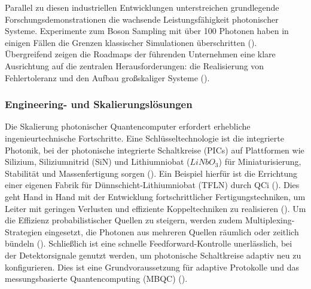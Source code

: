 Parallel zu diesen industriellen Entwicklungen unterstreichen grundlegende Forschungsdemonstrationen die wachsende Leistungsfähigkeit photonischer Systeme. Experimente zum Boson Sampling mit über 100 Photonen haben in einigen Fällen die Grenzen klassischer Simulationen überschritten (\cite{LinearOpticsScalable}). Übergreifend zeigen die Roadmaps der führenden Unternehmen eine klare Ausrichtung auf die zentralen Herausforderungen: die Realisierung von Fehlertoleranz und den Aufbau großskaliger Systeme (\cite{QuandelaAnnounces100000fold2025}).

\subsubsection{Engineering- und Skalierungslösungen}
Die Skalierung photonischer Quantencomputer erfordert erhebliche ingenieurtechnische Fortschritte. Eine Schlüsseltechnologie ist die integrierte Photonik, bei der photonische integrierte Schaltkreise (PICs) auf Plattformen wie Silizium, Siliziumnitrid (SiN) und Lithiumniobat ($LiNbO_3$) für Miniaturisierung, Stabilität und Massenfertigung sorgen (\cite{abughanemPhotonicQuantumComputers2024}). Ein Beispiel hierfür ist die Errichtung einer eigenen Fabrik für Dünnschicht-Lithiumniobat (TFLN) durch QCi (\cite{QuantumComputingInc}). Dies geht Hand in Hand mit der Entwicklung fortschrittlicher Fertigungstechniken, um Leiter mit geringen Verlusten und effiziente Koppeltechniken zu realisieren (\cite{LinearOpticsScalable}). Um die Effizienz probabilistischer Quellen zu steigern, werden zudem
Multiplexing-Strategien eingesetzt, die Photonen aus mehreren Quellen räumlich oder zeitlich bündeln (\cite{salavrakosPhotonnativeQuantumAlgorithms2025}). Schließlich ist eine schnelle
Feedforward-Kontrolle unerlässlich, bei der Detektorsignale genutzt werden, um photonische Schaltkreise adaptiv neu zu konfigurieren. Dies ist eine Grundvoraussetzung für adaptive Protokolle und das messungsbasierte Quantencomputing (MBQC) (\cite{salavrakosPhotonnativeQuantumAlgorithms2025}).

